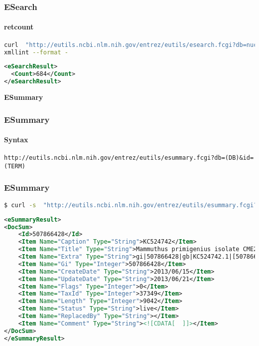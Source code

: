 \documentclass{beamer}
\newcommand{\centeredtitle}[1]{
\begin{center}
    \Huge{\bf{#1}}
\end{center}
}
\newcommand{\hugeslide}[1]{
\begin{frame}
\centeredtitle{#1}
\end{frame}
}
\begin{document}
\begin{frame}[fragile]
\frametitle{ESearch}
\framesubtitle{retcount  }
\begin{lstlisting}[language=bash,basicstyle=\tiny,breaklines=true]
curl  "http://eutils.ncbi.nlm.nih.gov/entrez/eutils/esearch.fcgi?db=nucleotide&term=%22Mammuthus%20primigenius%22%5BORGN%5D&rettype=count" |\
xmllint --format -
\end{lstlisting}

\begin{lstlisting}[language=xml,breaklines=false]
<eSearchResult>
  <Count>684</Count>
</eSearchResult>
\end{lstlisting}
\end{frame}


\hugeslide{ESummary}


\begin{frame}[fragile]
\frametitle{ESummary}
\framesubtitle{Syntax}
\begin{lstlisting}
http://eutils.ncbi.nlm.nih.gov/entrez/eutils/esummary.fcgi?db=(DB)&id=(TERM)
\end{lstlisting}
\end{frame}


\begin{frame}[fragile]
\frametitle{ESummary}
\begin{lstlisting}[language=bash,basicstyle=\tiny,breaklines=true]
$ curl -s  "http://eutils.ncbi.nlm.nih.gov/entrez/eutils/esummary.fcgi?db=nucleotide&id=507866428"
\end{lstlisting}

\begin{lstlisting}[language=xml,basicstyle=\tiny,breaklines=false]
<eSummaryResult>
<DocSum>
	<Id>507866428</Id>
	<Item Name="Caption" Type="String">KC524742</Item>
	<Item Name="Title" Type="String">Mammuthus primigenius isolate CME2005/915 myoglobin (Mb) gene, partial cds</Item>
	<Item Name="Extra" Type="String">gi|507866428|gb|KC524742.1|[507866428]</Item>
	<Item Name="Gi" Type="Integer">507866428</Item>
	<Item Name="CreateDate" Type="String">2013/06/15</Item>
	<Item Name="UpdateDate" Type="String">2013/06/21</Item>
	<Item Name="Flags" Type="Integer">0</Item>
	<Item Name="TaxId" Type="Integer">37349</Item>
	<Item Name="Length" Type="Integer">9042</Item>
	<Item Name="Status" Type="String">live</Item>
	<Item Name="ReplacedBy" Type="String"></Item>
	<Item Name="Comment" Type="String"><![CDATA[  ]]></Item>
</DocSum>
</eSummaryResult>
\end{lstlisting}
\end{frame}
\end{document}

